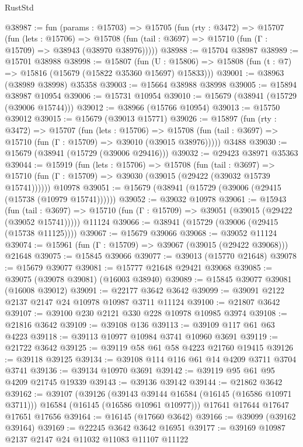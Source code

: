 \begin{lexlean}{RustStd}
\begin{coremodule}
@38987 := fun (params : @15703) =>
  @15705
    (fun (rty : @3472) =>
    @15707
      (fun (lets : @15706) =>
      @15708 (fun (tail : @3697) => @15710 (fun (Γ : @15709) => @38943 (@38970 @38976)))))
@38988 := @15704 @38987
@38989 := @15701 @38988
@38998 := @15807
    (fun (U : @15806) => @15808 (fun (t : @7) => @15816 (@15679 (@15822 @35360 @15697) @15833)))
@39001 := @38963 (@38989 @38998) @35358
@39003 := @15664 @38988 @38998
@39005 := @15894 @38987 @10954
@39006 := @15731 @10954
@39010 := @15679 (@38941 (@15729 (@39006 @15744)))
@39012 := @38966 (@15766 @10954)
@39013 := @15750 @39012
@39015 := @15679 (@39013 @15771)
@39026 := @15897
    (fun (rty : @3472) =>
    @15707
      (fun (lets : @15706) =>
      @15708 (fun (tail : @3697) => @15710 (fun (Γ : @15709) => @39010 (@39015 @38976)))))
    @3488
@39030 := @15679 (@38941 (@15729 (@39006 @29416)))
@39032 := @29423 @38971 @35363
@39044 := @15919
    (fun (lets : @15706) =>
    @15708
      (fun (tail : @3697) =>
      @15710 (fun (Γ : @15709) => @39030 (@39015 (@29422 (@39032 @15739 @15741))))))
    @10978
@39051 := @15679 (@38941 (@15729 (@39006 (@29415 (@15738 (@10979 @15741))))))
@39052 := @39032 @10978
@39061 := @15943
    (fun (tail : @3697) => @15710 (fun (Γ : @15709) => @39051 (@39015 (@29422 (@39052 @15741)))))
    @11124
@39066 := @38941 (@15729 (@39006 (@29415 (@15738 @11125))))
@39067 := @15679 @39066
@39068 := @39052 @11124
@39074 := @15961 (fun (Γ : @15709) => @39067 (@39015 (@29422 @39068))) @21648
@39075 := @15845 @39066
@39077 := @39013 (@15770 @21648)
@39078 := @15679 @39077
@39081 := @15777 @21648 @29421 @39068
@39085 := @39075 (@39078 @39081) (@16003 @38940)
@39089 := @15845 @39077 @39081 (@16008 @39012)
@39091 := @22177 @3642 @3642
@39099 := @39091 @2122 @2137 @2147 @24 @10978 @10987 @3711 @11124
@39100 := @21807 @3642
@39107 := @39100 @230 @2121 @330 @228 @10978 @10985 @3974
@39108 := @21816 @3642
@39109 := @39108 @136
@39113 := @39109 @117 @61 @63 @4223
@39118 := @39113 @10977 @10984 @3741 @10960 @3691
@39119 := @21722 @3642
@39125 := @39119 @58 @61 @58 @4223 @21760 @19415
@39126 := @39118 @39125
@39134 := @39108 @114 @116 @61 @14 @4209 @3711 @3704 @3741
@39136 := @39134 @10970 @3691
@39142 := @39119 @95 @61 @95 @4209 @21745 @19339
@39143 := @39136 @39142
@39144 := @21862 @3642
@39162 := @39107
    (@39126
      (@39143 @39144 @16584 (@16145 (@16586 @10971 @3711)))
      @16584
      (@16145 (@16586 @10961 @10977)))
    @17641
    @17644
    @17647
    @17651
    @17656
@39164 := @16145 (@17660 @3642)
@39166 := @39099 (@39162 @39164)
@39169 := @22245 @3642 @3642 @16951
@39177 := @39169 @10987 @2137 @2147 @24 @11032 @11083 @11107 @11122

\end{coremodule}
\end{lexlean}
